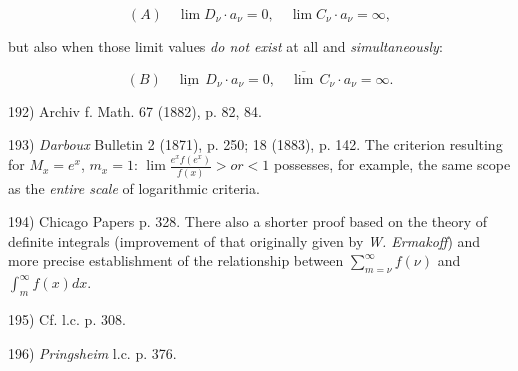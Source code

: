 \vspace{-0.4cm}
$$(A) \quad \lim D_\nu \cdot a_\nu = 0, \quad \lim C_\nu \cdot a_\nu = \infty,$$
\vspace{-0.4cm}

but also when those limit values \textit{do not exist} at all and \textit{simultaneously}:

\vspace{-0.4cm}
$$(B) \quad \underline{\lim} \, D_\nu \cdot a_\nu = 0, \quad \overline{\lim} \, C_\nu \cdot a_\nu = \infty.$$
\vspace{-0.4cm}

\vfill
\leftline{\rule{2in}{0.4pt}}
\vspace{0.2cm}
{
\footnotesize
192) Archiv f. Math. 67 (1882), p. 82, 84.

193) \textit{Darboux} Bulletin 2 (1871), p. 250; 18 (1883), p. 142. The criterion resulting for $M_x = e^x$, $m_x = 1$: $\lim \frac{e^x f(e^x)}{f(x)}  > or < 1$ possesses, for example, the same scope as the \textit{entire scale} of logarithmic criteria.

194) Chicago Papers p. 328. There also a shorter proof based on the theory of definite integrals (improvement of that originally given by \textit{W. Ermakoff}) and more precise establishment of the relationship between $\sum_{m=\nu}^{\infty} f(\nu)$ and $\int_{m}^{\infty} f(x)dx$.

195) Cf. l.c. p. 308.

196) \textit{Pringsheim} l.c. p. 376.

}